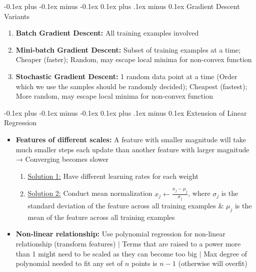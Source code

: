 \documentclass[landscape]{article}
\makeatletter
\renewcommand{\subsection}{\@startsection{subsection}{2}{0mm}%
  {-0.1ex plus -0.1ex minus -0.1ex}%
  {0.1ex plus .1ex minus 0.1ex}%
{\normalfont\scriptsize\bfseries}}
\makeatother
\begin{document}
\begin{multicols*}{5}
        \subsection{Gradient Descent Variants}
        \begin{enumerate}
          \item \textbf{Batch Gradient Descent:} All training examples involved
          \item \textbf{Mini-batch Gradient Descent:} Subset of training examples at a time; Cheaper (faster); Random, may escape local minima for non-convex function
          \item \textbf{Stochastic Gradient Descent:} 1 random data point at a time (Order which we use the samples should be randomly decided); Cheapest (fastest); More random, may escape local minima for non-convex function
        \end{enumerate}

        \subsection{Extension of Linear Regression}
        \begin{itemize}
          \item \textbf{Features of different scales:} A feature with smaller magnitude will take much smaller steps each update than another feature with larger magnitude → Converging becomes slower
          \begin{enumerate}
            \item \underline{Solution 1:} Have different learning rates for each weight
            \item \underline{Solution 2:} Conduct mean normalization $x_j \leftarrow \frac{x_j-\mu_j}{\sigma_j}$, where $\sigma_j$ is the standard deviation of the feature across all training examples \& $\mu_j$ is the mean of the feature across all training examples
          \end{enumerate}
          \item \textbf{Non-linear relationship:} Use polynomial regression for non-linear relationship (transform features) $|$ Terms that are raised to a power more than 1 might need to be scaled as they can become too big $|$ Max degree of polynomial needed to fit any set of $n$ points is $n-1$ (otherwise will overfit)
        \end{itemize}


\end{multicols*}
\end{document}

